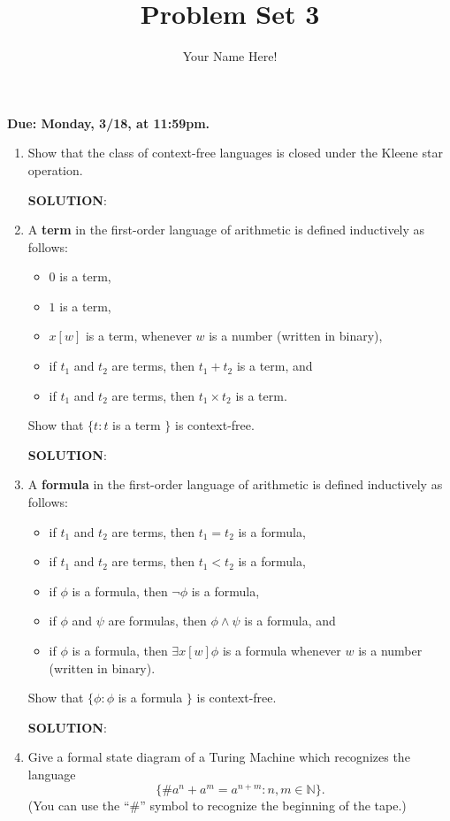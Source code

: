 \documentclass[12pt]{article}
\title{Problem Set 3}
\author{Your Name Here!}
\date{}
\newcommand{\sol}{\par{\bf SOLUTION}: }
\begin{document}
\maketitle

\noindent
    {\bf Due: Monday, 3/18, at 11:59pm. }
    
\begin{enumerate}
\item Show that the class of context-free languages is closed under the Kleene star operation. 

\sol %

\item A \textbf{term} in the first-order language of arithmetic is defined inductively as follows:
\begin{itemize}
	\item $0$ is a term,
	\item $1$ is a term,
	\item $x[w]$ is a term, whenever $w$ is a number (written in binary),
	\item if $t_1$ and $t_2$ are terms, then $t_1 + t_2$ is a term, and
	\item if $t_1$ and $t_2$ are terms, then $t_1 \times t_2$ is a term.
\end{itemize}

Show that $\{ t : t$ is a term $ \}$ is context-free.

\sol %

\item A \textbf{formula} in the first-order language of arithmetic is defined inductively as follows:
\begin{itemize}
	\item if $t_1$ and $t_2$ are terms, then $t_1 = t_2$ is a formula,
	\item if $t_1$ and $t_2$ are terms, then $t_1 < t_2$ is a formula,
	\item if $\phi$ is a formula, then $\lnot \phi$ is a formula,
	\item if $\phi$ and $\psi$ are formulas, then $\phi \wedge \psi$ is a formula, and
	\item if $\phi$ is a formula, then $\exists x[w] \phi$ is a formula whenever $w$ is a number (written in binary).
\end{itemize}

Show that $\{ \phi : \phi$ is a formula $ \}$ is context-free.

\sol %

\item Give a formal state diagram of a Turing Machine which recognizes the language 
\begin{displaymath}
\{\# a^n + a^m = a^{n+m} : n , m \in \mathbb{N} \}.
\end{displaymath} (You can use the ``$\#$'' symbol to recognize the beginning of the tape.)


\end{enumerate}
\end{document}

